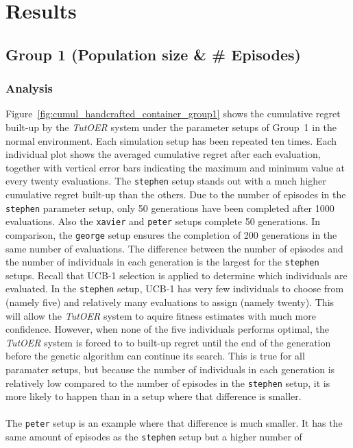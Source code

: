 \section{Results}
\label{sec:simulations_results}
\subsection{Group 1 (Population size \& \# Episodes)}
\subsubsection*{Analysis}
Figure~\ref{fig:cumul_handcrafted_container_group1} shows the cumulative
regret built-up by the \emph{TutOER} system under the parameter setups of Group~1
in the normal environment. Each simulation setup has
been repeated ten times. Each individual plot shows the averaged cumulative
regret after each evaluation, together with vertical error bars indicating the
maximum and minimum value at every twenty evaluations. The \texttt{stephen} setup stands out with a
much higher cumulative regret built-up than the others. Due to the number of episodes in the
\texttt{stephen} parameter setup, only 50 generations have been completed after
1000 evaluations. Also the \texttt{xavier} and \texttt{peter} setups complete
50 generations. In comparison, the \texttt{george} setup ensures the completion
of 200 generations in the same number of evaluations. The difference between
the number of episodes and the number of individuals in each generation is the
largest for the \texttt{stephen} setups. Recall that UCB-1 selection is applied
to determine which individuals are evaluated. In the \texttt{stephen} setup,
UCB-1 has very few individuals to choose from (namely five) and relatively many
evaluations to assign (namely twenty). This will allow the \emph{TutOER} system
to aquire fitness estimates with much more confidence. However, when none of
the five individuals performs optimal, the \emph{TutOER} system is forced to
to built-up regret until the end of the generation before the genetic algorithm
can continue its search. This is true for all paramater setups, but
because the number of individuals in each generation is relatively low compared
to the number of episodes in the \texttt{stephen} setup, it is more likely to
happen than in a setup where that difference is smaller.\\\\
\noindent
The \texttt{peter}
setup is an example where that difference is much smaller. It has the same
amount of episodes as the \texttt{stephen} setup but a higher number of
